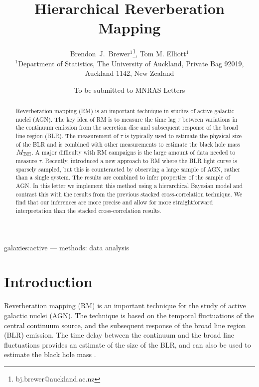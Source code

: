 \documentclass[useAMS,usenatbib]{mn2e}
\title[Hierarchical Reverberation Mapping]
{Hierarchical Reverberation Mapping}
\author[Brewer and Elliott]{%
  Brendon~J.~Brewer$^{1}$\thanks{bj.brewer@auckland.ac.nz},
  Tom M. Elliott$^{1}$
  \medskip\\
  $^1$Department of Statistics, The University of Auckland, Private Bag 92019, Auckland 1142, New Zealand}
\begin{document}
             
\date{To be submitted to MNRAS Letters}
             
\maketitle

\label{firstpage}


\begin{abstract}
Reverberation mapping (RM) is an important technique in studies of active
galactic nuclei (AGN). The key idea of RM is to measure the time lag $\tau$
between variations in the continuum emission from the accretion disc
and subsequent response of the broad line region (BLR). The measurement of
$\tau$ is typically used to estimate the physical size of the BLR and is
combined with other measurements to estimate the black hole mass $M_{\rm BH}$.
A major difficulty with RM campaigns is the large amount of data needed to
measure $\tau$. Recently, \citet{2012MNRAS.427.2701F} introduced a new approach
to RM where the BLR light curve is sparsely sampled, but this is counteracted
by observing a large sample of AGN, rather than a single system.
The results are combined to infer properties of the sample of
AGN. In this letter we implement this method using a hierarchical
Bayesian model and contrast this with the results from the previous stacked
cross-correlation technique. We find that our inferences are more precise and
allow for more straightforward interpretation than the stacked cross-correlation
results.
\end{abstract}

\begin{keywords}
galaxies:active --- methods: data analysis
\end{keywords}


\section{Introduction}
Reverberation mapping (RM) is an important technique for the study
of active galactic nuclei (AGN). The technique is based on the temporal
fluctuations of the central continuum source, and the subsequent response
of the broad line region (BLR) emission. The time delay between the continuum
and the broad line fluctuations provides an estimate of the size of the BLR,
and can also be used to estimate the black hole mass \citep{peterson}.
\end{document}
